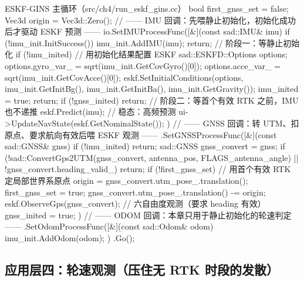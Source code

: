 \begin{codebox}[C++]{ESKF-GINS 主循环（src/ch4/run\_eskf\_gins.cc）}
bool first_gnss_set = false; Vec3d origin = Vec3d::Zero();
// —— IMU 回调：先喂静止初始化，初始化成功后才驱动 ESKF 预测 ——
io.SetIMUProcessFunc([&](const sad::IMU& imu) {
    if (!imu_init.InitSuccess()) { imu_init.AddIMU(imu); return; }   // 阶段一：等静止初始化
    if (!imu_inited) {                                               // 用初始化结果配置 ESKF
      sad::ESKFD::Options options;
      options.gyro_var_ = sqrt(imu_init.GetCovGyro()[0]);
      options.acce_var_ = sqrt(imu_init.GetCovAcce()[0]);
      eskf.SetInitialConditions(options, imu_init.GetInitBg(), imu_init.GetInitBa(),
                                imu_init.GetGravity());
      imu_inited = true; return;
    }
    if (!gnss_inited) return;        // 阶段二：等首个有效 RTK 之前，IMU 也不递推
    eskf.Predict(imu);               // 稳态：高频预测
    ui->UpdateNavState(eskf.GetNominalState());
  })
// —— GNSS 回调：转 UTM、扣原点、要求航向有效后喂 ESKF 观测 ——
  .SetGNSSProcessFunc([&](const sad::GNSS& gnss) {
    if (!imu_inited) return;
    sad::GNSS gnss_convert = gnss;
    if (!sad::ConvertGps2UTM(gnss_convert, antenna_pos, FLAGS_antenna_angle) ||
        !gnss_convert.heading_valid_) return;
    if (!first_gnss_set) {           // 用首个有效 RTK 定局部世界系原点
      origin = gnss_convert.utm_pose_.translation(); first_gnss_set = true;
    }
    gnss_convert.utm_pose_.translation() -= origin;
    eskf.ObserveGps(gnss_convert);   // 六自由度观测（要求 heading 有效）
    gnss_inited = true;
  })
// —— ODOM 回调：本章只用于静止初始化的轮速判定 ——
  .SetOdomProcessFunc([&](const sad::Odom& odom) { imu_init.AddOdom(odom); })
  .Go();
\end{codebox}

\subsection{应用层四：轮速观测（压住无 RTK 时段的发散）}
\label{sec:gins-wheel}

